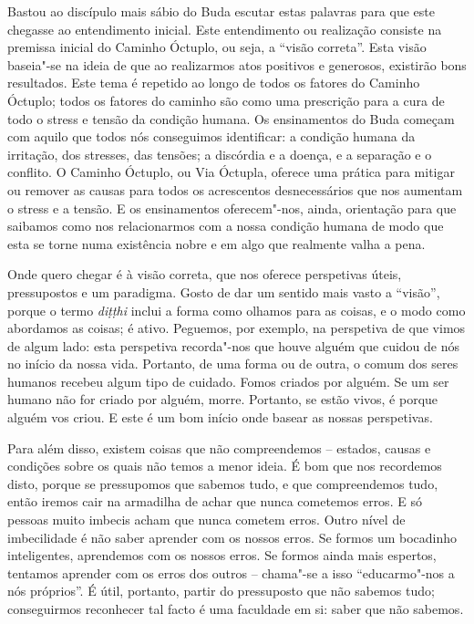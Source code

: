Bastou ao discípulo mais sábio do Buda escutar estas palavras para que este
chegasse ao entendimento inicial. Este entendimento ou realização consiste na
premissa inicial do Caminho Óctuplo, ou seja, a ``visão correta''. Esta visão
baseia"-se na ideia de que ao realizarmos atos positivos e generosos, existirão
bons resultados. Este tema é repetido ao longo de todos os fatores do Caminho
Óctuplo; todos os fatores do caminho são como uma prescrição para a cura de todo
o stress e tensão da condição humana. Os ensinamentos do Buda começam com aquilo
que todos nós conseguimos identificar: a condição humana da irritação, dos
stresses, das tensões; a discórdia e a doença, e a separação e o conflito. O
Caminho Óctuplo, ou Via Óctupla, oferece uma prática para mitigar ou remover as
causas para todos os acrescentos desnecessários que nos aumentam o stress e a
tensão. E os ensinamentos oferecem"-nos, ainda, orientação para que saibamos como
nos relacionarmos com a nossa condição humana de modo que esta se torne numa
existência nobre e em algo que realmente valha a pena.

Onde quero chegar é à visão correta, que nos oferece perspetivas úteis,
pressupostos e um paradigma. Gosto de dar um sentido mais vasto a ``visão'',
porque o termo \emph{diṭṭhi} inclui a forma como olhamos para as coisas, e o
modo como abordamos as coisas; é ativo. Peguemos, por exemplo, na perspetiva de
que vimos de algum lado: esta perspetiva recorda"-nos que houve alguém que cuidou
de nós no início da nossa vida. Portanto, de uma forma ou de outra, o comum dos
seres humanos recebeu algum tipo de cuidado. Fomos criados por alguém. Se um
ser humano não for criado por alguém, morre. Portanto, se estão vivos, é porque
alguém vos criou. E este é um bom início onde basear as nossas perspetivas.

Para além disso, existem coisas que não compreendemos -- estados, causas e
condições sobre os quais não temos a menor ideia. É bom que nos recordemos
disto, porque se pressupomos que sabemos tudo, e que compreendemos tudo, então
iremos cair na armadilha de achar que nunca cometemos erros. E só pessoas muito
imbecis acham que nunca cometem erros. Outro nível de imbecilidade é não saber
aprender com os nossos erros. Se formos um bocadinho inteligentes, aprendemos
com os nossos erros. Se formos ainda mais espertos, tentamos aprender com os
erros dos outros -- chama"-se a isso ``educarmo"-nos a nós próprios''. É útil,
portanto, partir do pressuposto que não sabemos tudo; conseguirmos reconhecer 
tal facto é uma faculdade em si: saber que não sabemos.

